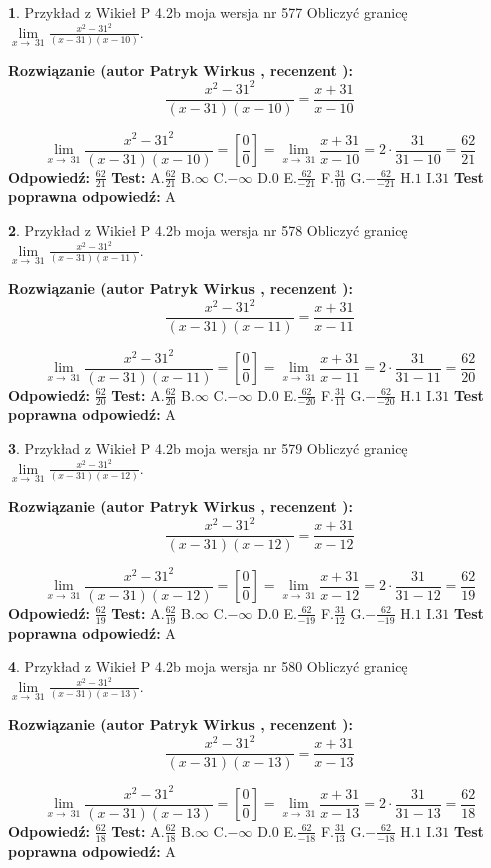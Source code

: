 \documentclass[12pt, a4paper]{article}
\theoremstyle{definition} %
\newtheorem{zad}{}
\newcommand{\zadStart}[1]{\begin{zad}#1\newline}
\newcommand{\zadStop}{\end{zad}}
\newcommand{\rozwStart}[2]{\noindent \textbf{Rozwiązanie (autor #1 , recenzent #2): }\newline}
\newcommand{\rozwStop}{\newline}
\newcommand{\odpStart}{\noindent \textbf{Odpowiedź:}\newline}
\newcommand{\odpStop}{\newline}
\newcommand{\testStart}{\noindent \textbf{Test:}\newline}
\newcommand{\testStop}{\newline}
\newcommand{\kluczStart}{\noindent \textbf{Test poprawna odpowiedź:}\newline}
\newcommand{\kluczStop}{\newline}
\begin{document}
\zadStart{Przykład z Wikieł P 4.2b moja wersja nr 577}
Obliczyć granicę $\lim\limits_{x\to\ 31}\frac{x^{2}-31^{2}}{(x-31)(x-10)}$.
\zadStop
\rozwStart{Patryk Wirkus}{}
$$\frac{x^{2}-31^{2}}{(x-31)(x-10)}=\frac{x+31}{x-10}$$

$$\lim\limits_{x\to\ 31}\frac{x^{2}-31^{2}}{(x-31)(x-10)}=[\frac{0}{0}]=\lim\limits_{x\to\ 31}\frac{x+31}{x-10}=2 \cdot \frac{31}{31-10} = \frac{62}{21}$$
\rozwStop
\odpStart
$\frac{62}{21}$
\odpStop
\testStart
A.$\frac{62}{21}$
B.$\infty$
C.$-\infty$
D.$0$
E.$\frac{62}{-21}$
F.$\frac{31}{10}$
G.$-\frac{62}{-21}$
H.$1$
I.$31$
\testStop
\kluczStart
A
\kluczStop



\zadStart{Przykład z Wikieł P 4.2b moja wersja nr 578}
Obliczyć granicę $\lim\limits_{x\to\ 31}\frac{x^{2}-31^{2}}{(x-31)(x-11)}$.
\zadStop
\rozwStart{Patryk Wirkus}{}
$$\frac{x^{2}-31^{2}}{(x-31)(x-11)}=\frac{x+31}{x-11}$$

$$\lim\limits_{x\to\ 31}\frac{x^{2}-31^{2}}{(x-31)(x-11)}=[\frac{0}{0}]=\lim\limits_{x\to\ 31}\frac{x+31}{x-11}=2 \cdot \frac{31}{31-11} = \frac{62}{20}$$
\rozwStop
\odpStart
$\frac{62}{20}$
\odpStop
\testStart
A.$\frac{62}{20}$
B.$\infty$
C.$-\infty$
D.$0$
E.$\frac{62}{-20}$
F.$\frac{31}{11}$
G.$-\frac{62}{-20}$
H.$1$
I.$31$
\testStop
\kluczStart
A
\kluczStop



\zadStart{Przykład z Wikieł P 4.2b moja wersja nr 579}
Obliczyć granicę $\lim\limits_{x\to\ 31}\frac{x^{2}-31^{2}}{(x-31)(x-12)}$.
\zadStop
\rozwStart{Patryk Wirkus}{}
$$\frac{x^{2}-31^{2}}{(x-31)(x-12)}=\frac{x+31}{x-12}$$

$$\lim\limits_{x\to\ 31}\frac{x^{2}-31^{2}}{(x-31)(x-12)}=[\frac{0}{0}]=\lim\limits_{x\to\ 31}\frac{x+31}{x-12}=2 \cdot \frac{31}{31-12} = \frac{62}{19}$$
\rozwStop
\odpStart
$\frac{62}{19}$
\odpStop
\testStart
A.$\frac{62}{19}$
B.$\infty$
C.$-\infty$
D.$0$
E.$\frac{62}{-19}$
F.$\frac{31}{12}$
G.$-\frac{62}{-19}$
H.$1$
I.$31$
\testStop
\kluczStart
A
\kluczStop



\zadStart{Przykład z Wikieł P 4.2b moja wersja nr 580}
Obliczyć granicę $\lim\limits_{x\to\ 31}\frac{x^{2}-31^{2}}{(x-31)(x-13)}$.
\zadStop
\rozwStart{Patryk Wirkus}{}
$$\frac{x^{2}-31^{2}}{(x-31)(x-13)}=\frac{x+31}{x-13}$$

$$\lim\limits_{x\to\ 31}\frac{x^{2}-31^{2}}{(x-31)(x-13)}=[\frac{0}{0}]=\lim\limits_{x\to\ 31}\frac{x+31}{x-13}=2 \cdot \frac{31}{31-13} = \frac{62}{18}$$
\rozwStop
\odpStart
$\frac{62}{18}$
\odpStop
\testStart
A.$\frac{62}{18}$
B.$\infty$
C.$-\infty$
D.$0$
E.$\frac{62}{-18}$
F.$\frac{31}{13}$
G.$-\frac{62}{-18}$
H.$1$
I.$31$
\testStop
\kluczStart
A
\kluczStop
\end{document}
